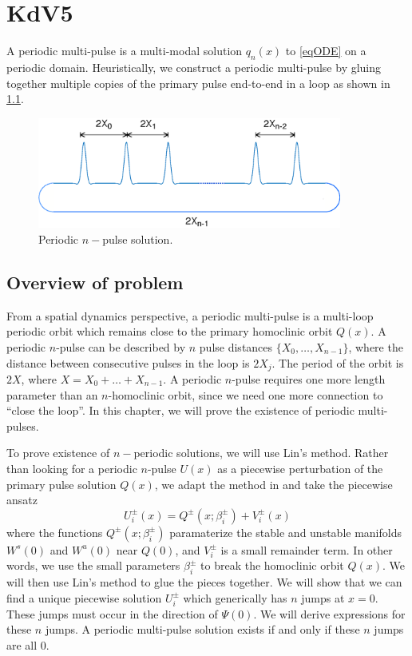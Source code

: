 \documentclass[thesis.tex]{subfiles}
\begin{document}
\iffulldocument\else
	\chapter{KdV5}
\fi

A periodic multi-pulse is a multi-modal solution $q_n(x)$ to \cref{eqODE} on a periodic domain. Heuristically, we construct a periodic multi-pulse by gluing together multiple copies of the primary pulse end-to-end in a loop as shown in \cref{fig:permultipulse}.
\begin{figure}
\label{fig:permultipulse}
\includegraphics[width=10cm]{periodic/multipulseperiodic}
\caption{Periodic $n-$pulse solution.}
\end{figure}

\section{Overview of problem}

From a spatial dynamics perspective, a periodic multi-pulse is a multi-loop periodic orbit which remains close to the primary homoclinic orbit $Q(x)$. A periodic $n$-pulse can be described by $n$ pulse distances $\{X_0, \dots, X_{n-1} \}$, where the distance between consecutive pulses in the loop is $2 X_j$. The period of the orbit is $2X$, where $X = X_0 + \dots + X_{n-1}$. A periodic $n$-pulse requires one more length parameter than an $n$-homoclinic orbit, since we need one more connection to ``close the loop''. In this chapter, we will prove the existence of periodic multi-pulses.

To prove existence of $n-$periodic solutions, we will use Lin's method. Rather than looking for a periodic $n$-pulse $U(x)$ as a piecewise perturbation of the primary pulse solution $Q(x)$, we adapt the method in \cite{Sandstede1997} and take the piecewise ansatz
\[
U_i^\pm(x) = Q^\pm(x; \beta_i^\pm) + V_i^\pm(x)
\]
where the functions $Q^\pm(x; \beta_i^\pm)$ paramaterize the stable and unstable manifolds $W^s(0)$ and $W^u(0)$ near $Q(0)$, and $V_i^\pm$ is a small remainder term. In other words, we use the small parameters $\beta_i^\pm$ to break the homoclinic orbit $Q(x)$. We will then use Lin's method to glue the pieces together. We will show that we can find a unique piecewise solution $U_i^\pm$ which generically has $n$ jumps at $x = 0$. These jumps must occur in the direction of $\Psi(0)$. We will derive expressions for these $n$ jumps. A periodic multi-pulse solution exists if and only if these $n$ jumps are all 0.
\end{document}
